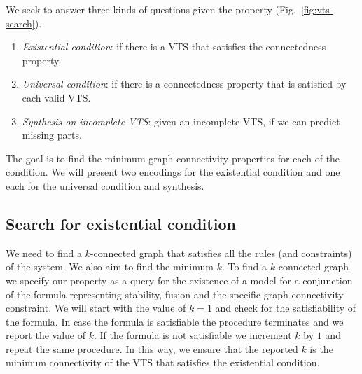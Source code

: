 \vspace{0.2cm}
\noindent We seek to answer three kinds of questions given the property (Fig.~\ref{fig:vts-search}).
\begin{enumerate}
\item {\em Existential condition}:
if there is a VTS that satisfies the connectedness property. 

\item {\em Universal condition}:
  if there is a connectedness property that is satisfied by each valid VTS.
\item{\em Synthesis on incomplete VTS}:
    given an incomplete VTS, if we can predict missing parts.
\end{enumerate}
The goal is to find the minimum graph connectivity properties for each of the condition. We will present two encodings for the existential condition and one each for the universal condition and synthesis.
\subsection{Search for existential condition} 
%
%
We need to find a $k$-connected graph that satisfies all the rules (and constraints) of the system. 
%
We also aim to find the minimum $k$. 
%
%
To find a $k$-connected graph we specify our property as a query for the existence
of a model for a conjunction of the formula representing stability, fusion and the specific
graph connectivity constraint. 
%
%
We will start with the value of $k = 1$ and check for the satisfiability of the formula.
%
In case the formula is satisfiable the procedure terminates and we report the value of $k$. 
%
If the formula is not satisfiable we increment $k$ by $1$ and repeat the same procedure. 
%
In this way, we ensure that the reported $k$ is the minimum connectivity of the VTS that
satisfies the existential condition.
%

